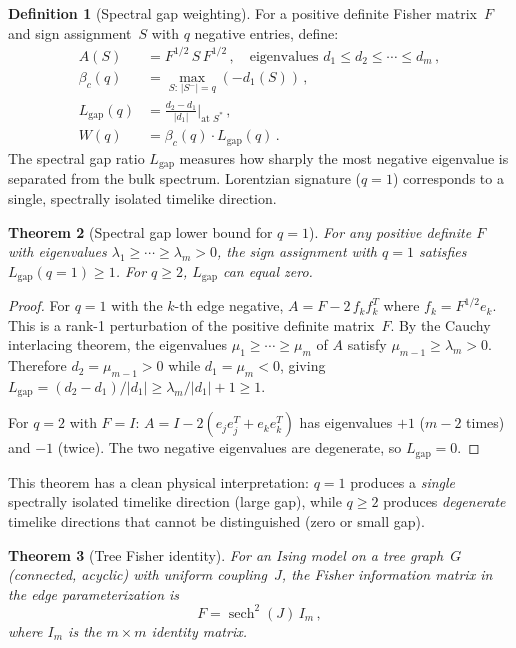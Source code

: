\documentclass[11pt]{article}
\newtheorem{theorem}{Theorem}[section]
\theoremstyle{definition}
\newtheorem{definition}[theorem]{Definition}
\theoremstyle{remark}
\begin{document}
\begin{definition}[Spectral gap weighting]
\label{def:spectral-gap-weighting}
For a positive definite Fisher matrix~$F$ and sign assignment~$S$ with
$q$ negative entries, define:
\begin{align}
A(S) &= F^{1/2}\, S\, F^{1/2}\,, \quad
\text{eigenvalues } d_1 \leq d_2 \leq \cdots \leq d_m\,, \\
\beta_c(q) &= \max_{S:\,|S^-|=q} (-d_1(S))\,, \\
L_{\mathrm{gap}}(q) &= \frac{d_2 - d_1}{|d_1|}
\bigg|_{\text{at } S^*}\,, \\
W(q) &= \beta_c(q) \cdot L_{\mathrm{gap}}(q)\,.
\end{align}
The spectral gap ratio $L_{\mathrm{gap}}$ measures how sharply the
most negative eigenvalue is separated from the bulk spectrum.
Lorentzian signature ($q = 1$) corresponds to a single, spectrally
isolated timelike direction.
\end{definition}

\begin{theorem}[Spectral gap lower bound for $q = 1$]
\label{thm:Lgap-bound}
For any positive definite $F$ with eigenvalues
$\lambda_1 \geq \cdots \geq \lambda_m > 0$, the sign assignment with
$q = 1$ satisfies $L_{\mathrm{gap}}(q = 1) \geq 1$.
For $q \geq 2$, $L_{\mathrm{gap}}$ can equal zero.
\end{theorem}

\begin{proof}
For $q = 1$ with the $k$-th edge negative,
$A = F - 2\,f_k f_k^T$ where $f_k = F^{1/2} e_k$.
This is a rank-1 perturbation of the positive definite matrix~$F$.
By the Cauchy interlacing theorem, the eigenvalues $\mu_1 \geq \cdots
\geq \mu_m$ of $A$ satisfy $\mu_{m-1} \geq \lambda_m > 0$.
Therefore $d_2 = \mu_{m-1} > 0$ while $d_1 = \mu_m < 0$,
giving $L_{\mathrm{gap}} = (d_2 - d_1)/|d_1| \geq \lambda_m/|d_1| + 1
\geq 1$.

For $q = 2$ with $F = I$: $A = I - 2(e_j e_j^T + e_k e_k^T)$ has
eigenvalues $+1$ ($m - 2$ times) and $-1$ (twice).
The two negative eigenvalues are degenerate, so
$L_{\mathrm{gap}} = 0$.
\end{proof}

This theorem has a clean physical interpretation: $q = 1$ produces a
\emph{single} spectrally isolated timelike direction (large gap), while
$q \geq 2$ produces \emph{degenerate} timelike directions that cannot
be distinguished (zero or small gap).

\begin{theorem}[Tree Fisher identity]
\label{thm:tree-fisher}
For an Ising model on a tree graph~$G$ (connected, acyclic) with
uniform coupling~$J$, the Fisher information matrix in the edge
parameterization is
\begin{equation}
\label{eq:tree-fisher}
F = \operatorname{sech}^2(J)\, I_m\,,
\end{equation}
where $I_m$ is the $m \times m$ identity matrix.
\end{theorem}
\end{document}

